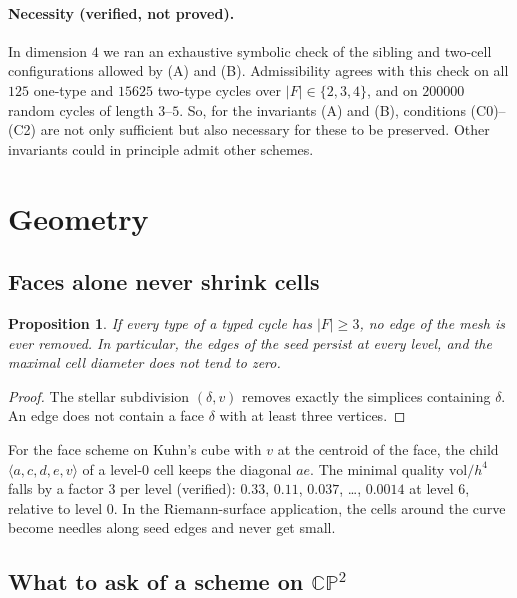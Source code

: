 \documentclass[11pt]{article}
\theoremstyle{plain}
\newtheorem{proposition}[theorem]{Proposition}
\theoremstyle{definition}
\theoremstyle{remark}
\newcommand{\CP}{\mathbb{CP}}
\begin{document}
\paragraph{Necessity (verified, not proved).}
In dimension $4$ we ran an exhaustive symbolic check of the sibling and
two-cell configurations allowed by (A) and (B). Admissibility agrees with
this check on all $125$ one-type and $15625$ two-type cycles over
$|F|\in\{2,3,4\}$, and on $200000$ random cycles of length $3$--$5$. So,
for the invariants (A) and (B), conditions (C0)--(C2) are not only
sufficient but also necessary for these to be preserved. Other invariants
could in principle admit other schemes.

\section{Geometry}\label{sec:geometry}

\subsection{Faces alone never shrink cells}

\begin{proposition}\label{prop:edges}
If every type of a typed cycle has $|F|\ge3$, no edge of the mesh is ever
removed. In particular, the edges of the seed persist at every level, and
the maximal cell diameter does not tend to zero.
\end{proposition}

\begin{proof}
The stellar subdivision $(\delta,v)$ removes exactly the simplices
containing $\delta$. An edge does not contain a face $\delta$ with at
least three vertices.
\end{proof}

For the face scheme on Kuhn's cube with $v$ at the centroid of the face,
the child $\langle a,c,d,e,v\rangle$ of a level-$0$ cell keeps the diagonal
$ae$. The minimal quality $\mathrm{vol}/h^4$ falls by a factor $3$ per level
(verified): $0.33$, $0.11$, $0.037$, \dots, $0.0014$ at level $6$,
relative to level $0$. In the Riemann-surface application, the cells
around the curve become needles along seed edges and never get small.

\subsection{What to ask of a scheme on $\CP^2$}
\end{document}

